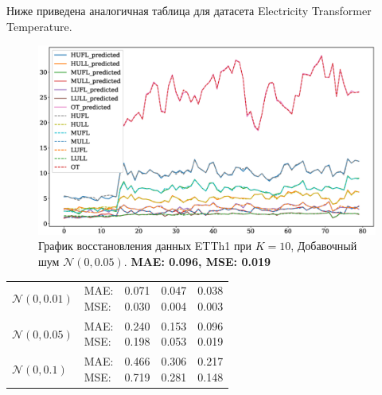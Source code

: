 \documentclass{article}
\begin{document}
Ниже приведена аналогичная таблица для датасета Electricity Transformer Temperature.

\begin{figure}[H]
	\centering
	\includegraphics[width=\textwidth]{ETT_time_series_K10N005.eps}
	\caption{График восстановления данных ETTh1 при $K=10$, Добавочный шум $\mathcal{N}(0, 0.05)$. \textbf{MAE: 0.096, MSE: 0.019}}
	\label{fig:fig7}
\end{figure}

\def\arraystretch{2.3}
\begin{tabular}{|l||l||*{3}{c|}}\hline
	\backslashbox{Шум}{Параметры}
	&\makebox[3em]{Метрика}&\makebox[3em]{$K=2$}&\makebox[3em]{$K=4$}&\makebox[3em]{$K=10$}\\\hline
	$\mathcal{N}(0, 0.01)$&\makecell{ MAE: \\ MSE: } &\makecell{ 0.071 \\ 0.030 }&\makecell{ 0.047 \\ 0.004 }&\makecell{ 0.038 \\ 0.003 }\\\hline
	$\mathcal{N}(0, 0.05)$&\makecell{ MAE: \\ MSE: } &\makecell{ 0.240 \\ 0.198 }&\makecell{ 0.153 \\ 0.053 }&\makecell{ 0.096 \\ 0.019 }\\\hline
	$\mathcal{N}(0, 0.1)$& \makecell{ MAE: \\ MSE: } &\makecell{ 0.466 \\ 0.719 }&\makecell{ 0.306 \\ 0.281 }&\makecell{ 0.217 \\ 0.148 }\\\hline
\end{tabular}
\end{document}

